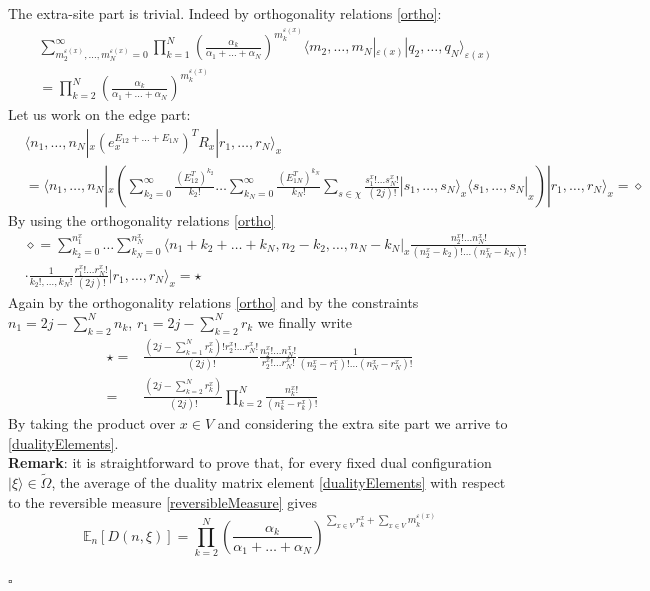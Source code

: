 \documentclass[11pt]{article}
\numberwithin{equation}{section}
\begin{document}
The extra-site part is trivial. Indeed by orthogonality relations \eqref{ortho}:
\begin{align*}
&\sum_{m_{2}^{\varepsilon(x)},\ldots,m_{N}^{\varepsilon(x)}=0}^{\infty}\prod_{k=1}^{N}\left(\frac{\alpha_{k}}{\alpha_{1}+\ldots+\alpha_{N}}\right)^{m_{k}^{\varepsilon(x)}}\langle m_{2},\ldots,m_{N}|_{\varepsilon(x)}|q_{2},\ldots,q_{N}\rangle_{\varepsilon(x)}\\&=
\prod_{k=2}^{N}\left(\frac{\alpha_{k}}{\alpha_{1}+\ldots+\alpha_{N}}\right)^{m_{k}^{\varepsilon(x)}}
\end{align*}
 Let us work on the edge part:
\begin{align*}
&\langle n_{1},\ldots,n_{N}|_{x}(e_{x}^{E_{12}+\ldots+E_{1N}})^{T}R_{x}|r_{1},\ldots,r_{N}\rangle_{x}\\&= \langle  n_{1},\ldots,n_{N}|_{x}\left(\sum_{k_{2}=0}^{\infty}\frac{(E_{12}^{T})^{k_{2}}}{k_{2}!}\ldots\sum_{k_{N}=0}^{\infty}\frac{(E_{1N}^{T})^{k_{N}}}{k_{N}!}\sum_{s\in\chi}\frac{s_{1}^{x}!\ldots s_{N}^{x}!}{(2j)!}|s_{1},\ldots,s_{N}\rangle_{x}\langle s_{1},\ldots,s_{N}|_{x}\right)|r_{1},\ldots,r_{N}\rangle_{x}=\diamond
\end{align*}
By using the orthogonality relations \eqref{ortho}
\begin{align*}&\diamond=
\sum_{k_{2}=0}^{n_{1}^{x}}\ldots\sum_{k_{N}=0}^{n_{N}^{x}}\langle n_{1}+k_{2}+\ldots+k_{N},n_{2}-k_{2},\ldots,n_{N}-k_{N}|_{x}\frac{n_{2}^{x}!\ldots n_{N}^{x}!}{(n_{2}^{x}-k_{2})!\ldots(n_{N}^{x}-k_{N})!}
\\&\cdot 
\frac{1}{k_{2}!,\ldots,k_{N}!}\frac{r_{1}^{x}!\ldots r_{N}^{x}!}{(2j)!}|r_{1},\ldots,r_{N}\rangle_{x}=\star
\end{align*}
Again by the orthogonality relations \eqref{ortho} and by the constraints $n_{1}=2j-\sum_{k=2}^{N}n_{k}$, $r_{1}=2j-\sum_{k=2}^{N}r_{k}$ we finally write
\begin{equation}
\begin{split}
\star=&\frac{(2j-\sum_{k=1}^{N}r_{k}^{x})!r_{2}^{x}!\ldots r_{N }^{x}!}{(2j)!}\frac{n_{2}^{x}!\ldots n_{N}^{x}!}{r_{2}^{x}!\ldots r_{N}^{x}!}\frac{1}{(n_{2}^{x}-r_{1}^{x})!\ldots (n_{N}^{x}-r_{N}^{x})!}\\=&
\frac{(2j-\sum_{k=2}^{N}r_{k}^{x})}{(2j)!}\prod_{k=2}^{N}\frac{n_{k}^{x}!}{(n_{k}^{x}-r_{k}^{x})!}
\end{split}
\end{equation}
By taking the product over $x\in V$ and considering the extra site part we arrive to \eqref{dualityElements}. \newline \\
\textbf{Remark}: it is straightforward to prove that, for every fixed dual configuration $|\xi\rangle \in \widetilde{\Omega}$, the average of the duality matrix  element \eqref{dualityElements} with respect to the reversible measure \eqref{reversibleMeasure} gives 
\begin{equation}
    \mathbb{E}_{n}\left[D(n,\xi)\right]=\prod_{k=2}^{N}\left(\frac{\alpha_{k}}{\alpha_{1}+\ldots+\alpha_{N}}\right)^{\sum_{x\in V}r_{k}^{x}+\sum_{x\in V}m_{k}^{\varepsilon(x)}}
\end{equation}
\begin{flushright}
    $\square$
\end{flushright}
\end{document}
